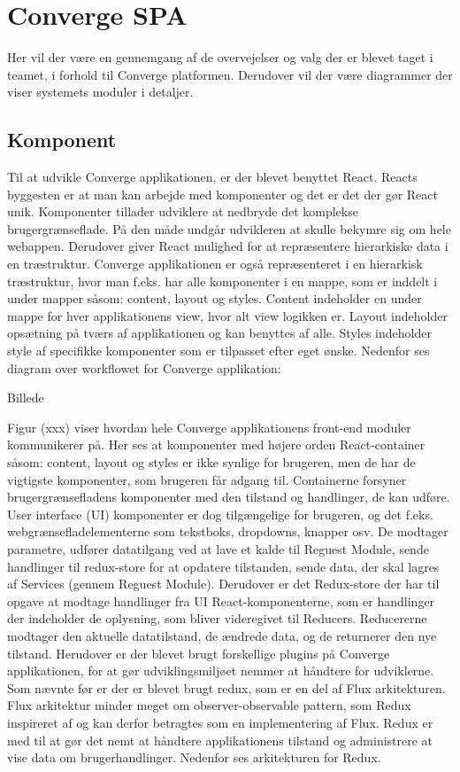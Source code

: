 \chapter{Converge SPA}
Her vil der være en gennemgang af de overvejelser og valg der er blevet taget i teamet, i forhold til Converge platformen. Derudover vil der være diagrammer der viser systemets moduler i detaljer. 

\section{Komponent}
Til at udvikle Converge applikationen, er der blevet benyttet React.  Reacts byggesten er at man kan arbejde med komponenter og det er det der gør React unik. Komponenter tillader udviklere at nedbryde det komplekse brugergrænseflade. På den måde undgår udvikleren at skulle bekymre sig om hele webappen. Derudover giver React mulighed for at repræsentere hierarkiske data i en træstruktur.
Converge applikationen er også repræsenteret i en hierarkisk træstruktur, hvor man f.eks. har alle komponenter i en mappe, som er inddelt i under mapper såsom: content, layout og styles. Content indeholder en under mappe for hver applikationens view, hvor alt view logikken er. Layout indeholder opsætning på tværs af applikationen og kan benyttes af alle. Styles indeholder style af specifikke komponenter som er tilpasset efter eget ønske.  
Nedenfor ses diagram over workflowet for Converge applikation:

Billede

Figur (xxx) viser hvordan hele Converge applikationens front-end moduler kommunikerer på. Her ses at komponenter med højere orden React-container såsom: content, layout og styles er ikke synlige for brugeren, men de har de vigtigste komponenter, som brugeren får adgang til. Containerne forsyner brugergrænsefladens komponenter med den tilstand og handlinger, de kan udføre. 
User interface (UI) komponenter er dog tilgængelige for brugeren, og det f.eks. webgrænsefladelementerne som tekstboks, dropdowns, knapper osv. De modtager parametre, udfører datatilgang ved at lave et kalde til Reguest Module, sende handlinger til redux-store for at opdatere tilstanden, sende data, der skal lagres af Services (gennem Reguest Module). 
Derudover er det Redux-store der har til opgave at modtage handlinger fra UI React-komponenterne, som er handlinger der indeholder de oplysning, som bliver videregivet til Reducers. Reducererne modtager den aktuelle datatilstand, de ændrede data, og de returnerer den nye tilstand. 
Herudover er der blevet brugt forskellige plugins på Converge applikationen, for at gør udviklingsmiljøet nemmer at håndtere for udviklerne. Som nævnte før er der er blevet brugt redux, som er en del af Flux arkitekturen. Flux arkitektur minder meget om observer-observable pattern, som Redux inspireret af og kan derfor betragtes som en implementering af Flux. Redux er med til at gør det nemt at håndtere applikationens tilstand og administrere at vise data om brugerhandlinger. Nedenfor ses arkitekturen for Redux.

